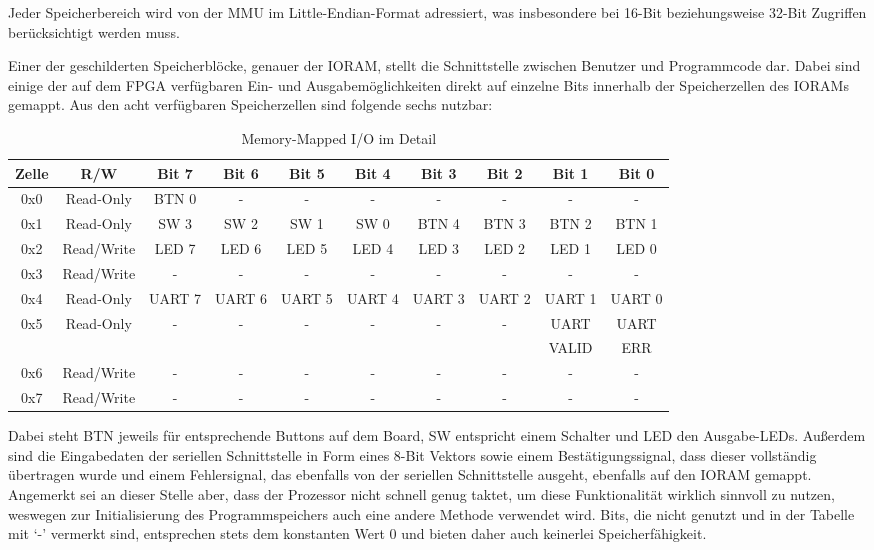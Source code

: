 Jeder Speicherbereich wird von der MMU im Little-Endian-Format adressiert, was insbesondere bei 16-Bit beziehungsweise 32-Bit Zugriffen ber\"ucksichtigt werden muss.

\label{sec:mmuio}
Einer der geschilderten Speicherbl\"ocke, genauer der IORAM, stellt die Schnittstelle zwischen Benutzer und Programmcode dar. Dabei sind einige der auf dem FPGA verf\"ugbaren Ein- und Ausgabem\"oglichkeiten direkt auf einzelne Bits innerhalb der Speicherzellen des IORAMs gemappt. Aus den acht verf\"ugbaren Speicherzellen sind folgende sechs nutzbar:

\begin{table}[H]
\begin{center}
	\begin{tabular}{| c | c | c | c | c | c | c | c | c | c |}
	\hline
	Zelle & R/W & Bit 7 & Bit 6 & Bit 5 & Bit 4 & Bit 3 & Bit 2 & Bit 1 & Bit 0 \\ \hline
	0x0 & Read-Only & BTN 0 & - & - & - & - & - & - & - \\ \hline
	0x1 & Read-Only & SW 3 & SW 2 & SW 1 & SW 0 & BTN 4 & BTN 3 & BTN 2 & BTN 1 \\ \hline
	0x2 & Read/Write & LED 7 & LED 6 & LED 5 & LED 4 & LED 3 & LED 2 & LED 1 & LED 0 \\ \hline
	0x3 & Read/Write & - & - & - & - & - & - & - & - \\ \hline
	0x4 & Read-Only & UART 7 & UART 6 & UART 5 & UART 4 & UART 3 & UART 2 & UART 1 & UART 0 \\ \hline
	0x5 & Read-Only & - & - & - & - & - & - & UART & UART \\
	 &  &   &   &   &   &   &   & VALID & ERR \\ \hline
	0x6 & Read/Write & - & - & - & - & - & - & - & - \\ \hline
	0x7 & Read/Write & - & - & - & - & - & - & - & - \\ \hline
	\end{tabular}
\end{center}
\caption{Memory-Mapped I/O im Detail}
\end{table}

Dabei steht BTN jeweils f\"ur entsprechende Buttons auf dem Board, SW entspricht einem Schalter und LED den Ausgabe-LEDs. Au\ss{}erdem sind die Eingabedaten der seriellen Schnittstelle in Form eines 8-Bit Vektors sowie einem Best\"atigungssignal, dass dieser vollst\"andig \"ubertragen wurde und einem Fehlersignal, das ebenfalls von der seriellen Schnittstelle ausgeht, ebenfalls auf den IORAM gemappt. Angemerkt sei an dieser Stelle aber, dass der Prozessor nicht schnell genug taktet, um diese Funktionalit\"at wirklich sinnvoll zu nutzen, weswegen zur Initialisierung des Programmspeichers auch eine andere Methode verwendet wird. Bits, die nicht genutzt und in der Tabelle mit `-' vermerkt sind, entsprechen stets dem konstanten Wert 0 und bieten daher auch keinerlei Speicherf\"ahigkeit.

